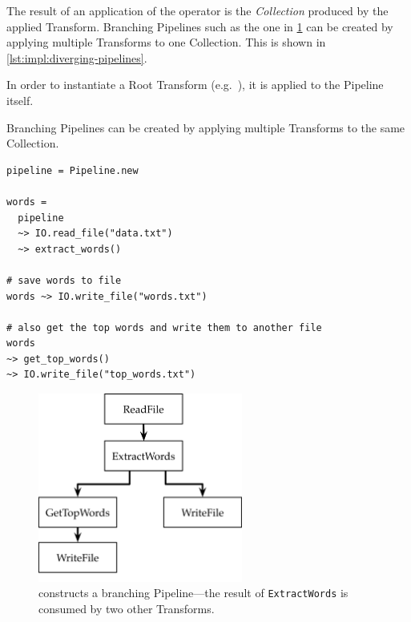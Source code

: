 The result of an application of the \exs{~>} operator is the \emph{Collection} produced by the applied Transform.
Branching Pipelines such as the one in \cref{fig:impl:dsl-branching-pipeline} can be created by applying multiple Transforms to one Collection.
This is shown in \cref{lst:impl:diverging-pipelines}.

In order to instantiate a Root Transform (e.g.\ ), it is applied to the Pipeline itself.

\begin{listing}[h]
	\caption[An example of creating branching Pipelines through application of multiple Transforms to one Collection.]{Branching Pipelines can be created by applying multiple Transforms to the same Collection.}
	\label{lst:impl:diverging-pipelines}
	\begin{verbatim}
pipeline = Pipeline.new

words =
  pipeline
  ~> IO.read_file("data.txt")
  ~> extract_words()
  
# save words to file
words ~> IO.write_file("words.txt")

# also get the top words and write them to another file
words
~> get_top_words()
~> IO.write_file("top_words.txt")
	\end{verbatim}
\end{listing}

\begin{figure}[h]
	\centering
	\includegraphics[width=0.6\textwidth]{images/diags/dsl-branching-pipeline}
	\caption[A branching Pipeline constructed in \cref{lst:impl:diverging-pipelines}.]{ constructs a branching Pipeline---the result of \texttt{ExtractWords} is consumed by two other Transforms.}
	\label{fig:impl:dsl-branching-pipeline}
\end{figure}

